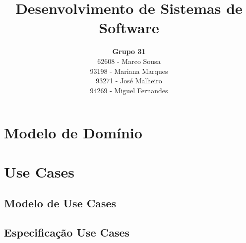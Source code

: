 \documentclass[a4paper, 12pt]{article}
\title {Desenvolvimento de Sistemas de Software}
\author{\textbf{Grupo 31}\\
        62608 - Marco Sousa \\
        93198 - Mariana Marques \\
        93271 - José Malheiro \\
        94269 - Miguel Fernandes}
\begin{document}
\maketitle

\section{Modelo de Domínio}

\section{Use Cases}

\subsection{Modelo de Use Cases}

\subsection{Especificação Use Cases}

\subsubsection{} \label{pedir_rep_normal}


\subsubsection{} \label{pedir_rep_xpress}


\subsubsection{} \label{fazer_orcamento}


\subsubsection{} \label{realizar_rep}


\subsubsection{} \label{autenticar}


\subsubsection{} \label{listagem_tecnico_resumida}


\subsubsection{} \label{listagem_tecnico_detalhada}


\subsubsection{} \label{listagem_func_balcao}

\end{document}
